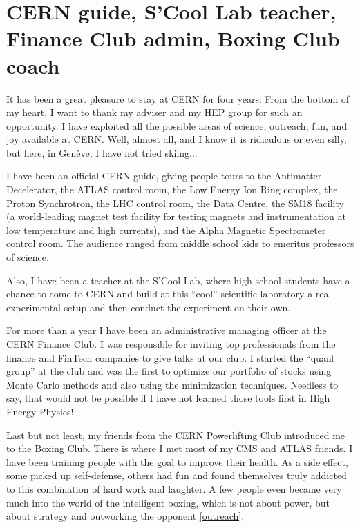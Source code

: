 \section*{CERN guide, S'Cool Lab teacher, Finance Club admin, Boxing Club coach}

It has been a great pleasure to stay at CERN for four years. From the bottom of my heart, I want to thank my adviser and my HEP group for such an opportunity. I have exploited all the possible areas of science, outreach, fun, and joy available at CERN. Well, almost all, and I know it is ridiculous or even silly, but here, in Gen\`eve, I have not tried skiing...

I have been an official CERN guide, giving people tours to the Antimatter Decelerator, the ATLAS control room, the Low Energy Ion Ring complex, the Proton Synchrotron, the LHC control room, the Data Centre, the SM18 facility (a world-leading magnet test facility for testing magnets and instrumentation at low temperature and high currents), and the Alpha Magnetic Spectrometer control room. The audience ranged from middle school kids to emeritus professors of science. 

Also, I have been a teacher at the S'Cool Lab, where high school students have a chance to come to CERN and build at this ``cool'' scientific laboratory a real experimental setup and then conduct the experiment on their own. 

For more than a year I have been an administrative managing officer at the CERN Finance Club. I was responsible for inviting top professionals from the finance and FinTech companies to give talks at our club. I started the ``quant group'' at the club and was the first to optimize our portfolio of stocks using Monte Carlo methods and also using the minimization techniques. Needless to say, that would not be possible if I have not learned those tools first in High Energy Physics!

Last but not least, my friends from the CERN Powerlifting Club introduced me to the Boxing Club. There is where I met most of my CMS and ATLAS friends. I have been training people with the goal to improve their health. As a side effect, some picked up self-defense, others had fun and found themselves truly addicted to this combination of hard work and laughter. A few people even became very much into the world of the intelligent boxing, which is not about power, but about strategy and outworking the opponent \ref{outreach}. 

